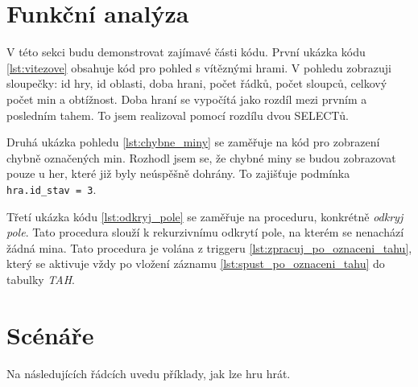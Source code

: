 \documentclass{article}
\begin{document}
\section{Funkční analýza}
V této sekci budu demonstrovat zajímavé části kódu.
První ukázka kódu \ref{lst:vitezove} obsahuje kód pro pohled s vítěznými hrami.
V pohledu zobrazuji sloupečky: id hry, id oblasti, doba hrani, počet řádků, počet sloupců,
celkový počet min a obtížnost. Doba hraní se vypočítá jako rozdíl mezi prvním
a posledním tahem. To jsem realizoval pomocí rozdílu dvou SELECTů.

\begin{minipage}{\linewidth}

\end{minipage}


Druhá ukázka pohledu \ref{lst:chybne_miny} se zaměřuje na kód pro zobrazení chybně označených min.
Rozhodl jsem se, že chybné miny se budou zobrazovat pouze u her, které již byly neúspěšně
dohrány. To zajišťuje podmínka \lstinline{hra.id_stav = 3}.

\begin{minipage}{\linewidth}

\end{minipage}

Třetí ukázka kódu \ref{lst:odkryj_pole} se zaměřuje na proceduru, 
konkrétně \textit{odkryj pole}. Tato procedura slouží k rekurzivnímu odkrytí pole, 
na kterém se nenachází žádná mina. 
Tato procedura je volána z triggeru \ref{lst:zpracuj_po_oznaceni_tahu}, 
který se aktivuje vždy po vložení záznamu \ref{lst:spust_po_oznaceni_tahu} 
do tabulky \textit{TAH}.

\begin{minipage}{\linewidth}

\end{minipage}

\begin{minipage}{\linewidth}

\end{minipage}

\section{Scénáře}
Na následujících řádcích uvedu příklady, jak lze hru hrát.
\end{document}
